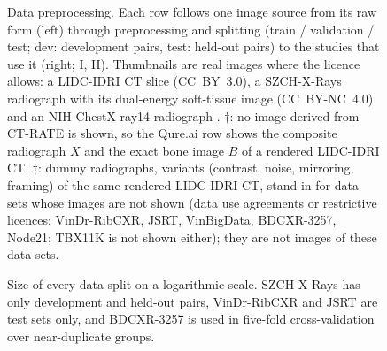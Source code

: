 \begin{figure}[!t]
\centering
{}
\caption{Data preprocessing. Each row follows one image source from its raw form (left) through preprocessing and splitting (train /
validation / test; dev: development pairs, test: held-out pairs) to the studies that use it (right; I, II). Thumbnails are real images
where the licence allows: a LIDC-IDRI CT slice \cite{armato2015lidctcia} (CC~BY~3.0), a SZCH-X-Rays radiograph with its dual-energy
soft-tissue image \cite{sun2026bsldm} (CC~BY-NC~4.0) and an NIH ChestX-ray14 radiograph \cite{wang2017chestxray}. $\dagger$: no image
derived from CT-RATE is shown, so the Qure.ai row shows the composite radiograph $X$ and the exact bone image $B$ of a rendered LIDC-IDRI
CT. $\ddagger$: dummy radiographs, variants (contrast, noise, mirroring, framing) of the same rendered LIDC-IDRI CT, stand in for data sets
whose images are not shown (data use agreements or restrictive licences: VinDr-RibCXR, JSRT, VinBigData, BDCXR-3257, Node21; TBX11K is
not shown either); they are not images of these data sets.}
\label{fig:data_pipeline}
\end{figure}

\begin{figure}[!t]
\centering
{}
\caption{Size of every data split on a logarithmic scale. SZCH-X-Rays has only development and held-out pairs, VinDr-RibCXR and JSRT are
test sets only, and BDCXR-3257 is used in five-fold cross-validation over near-duplicate groups.}
\label{fig:data_splits}
\end{figure}


